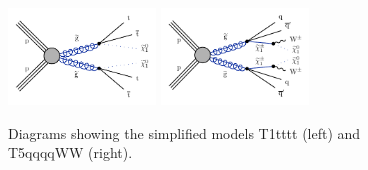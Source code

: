 \begin{figure}[!h]
  \includegraphics[width=0.35\textwidth]{Plots/feyndiagrams/T1tttt.pdf}
  \hfil
  \includegraphics[width=0.35\textwidth]{Plots/feyndiagrams/T5qqqqWW.pdf}
  \hfil
\centering
  \caption[The simplified models diagrams]{\label{fig:diagrams} Diagrams showing the simplified models T1tttt (left) and
T5qqqqWW (right).  %
  }
\end{figure}

